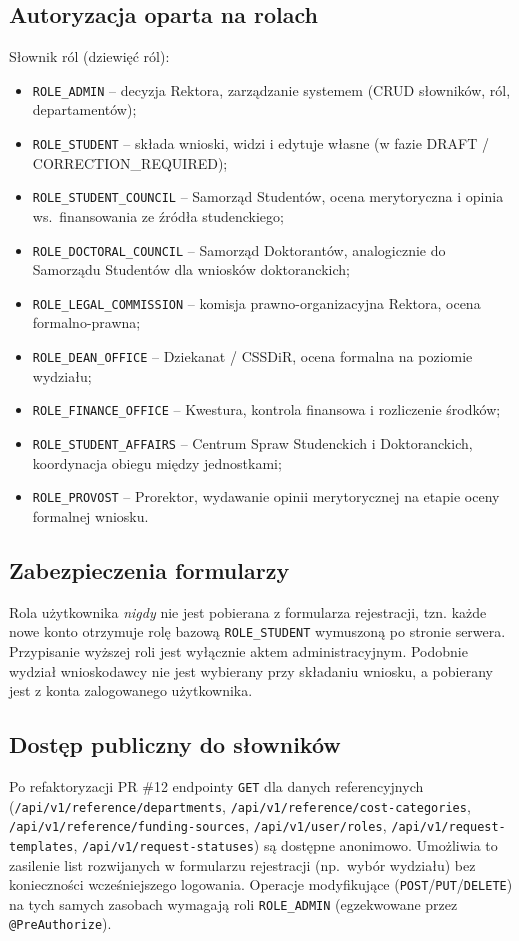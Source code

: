 \documentclass[12pt,a4paper]{article}
\begin{document}
\subsection{Autoryzacja oparta na rolach}
Słownik ról (dziewięć ról):
\begin{itemize}[leftmargin=*]
  \item \texttt{ROLE\_ADMIN} -- decyzja Rektora, zarządzanie systemem (CRUD słowników, ról, departamentów);
  \item \texttt{ROLE\_STUDENT} -- składa wnioski, widzi i edytuje własne (w fazie DRAFT / CORRECTION\_REQUIRED);
  \item \texttt{ROLE\_STUDENT\_COUNCIL} -- Samorząd Studentów, ocena merytoryczna i opinia ws.\ finansowania ze źródła studenckiego;
  \item \texttt{ROLE\_DOCTORAL\_COUNCIL} -- Samorząd Doktorantów, analogicznie do Samorządu Studentów dla wniosków doktoranckich;
  \item \texttt{ROLE\_LEGAL\_COMMISSION} -- komisja prawno-organizacyjna Rektora, ocena formalno-prawna;
  \item \texttt{ROLE\_DEAN\_OFFICE} -- Dziekanat / CSSDiR, ocena formalna na poziomie wydziału;
  \item \texttt{ROLE\_FINANCE\_OFFICE} -- Kwestura, kontrola finansowa i rozliczenie środków;
  \item \texttt{ROLE\_STUDENT\_AFFAIRS} -- Centrum Spraw Studenckich i Doktoranckich, koordynacja obiegu między jednostkami;
  \item \texttt{ROLE\_PROVOST} -- Prorektor, wydawanie opinii merytorycznej na etapie oceny formalnej wniosku.
\end{itemize}

\subsection{Zabezpieczenia formularzy}
Rola użytkownika \emph{nigdy} nie jest pobierana z formularza rejestracji, tzn.
każde nowe konto otrzymuje rolę bazową \texttt{ROLE\_STUDENT} wymuszoną po stronie
serwera. Przypisanie wyższej roli jest wyłącznie aktem administracyjnym.
Podobnie wydział wnioskodawcy nie jest wybierany przy składaniu wniosku, a
pobierany jest z konta zalogowanego użytkownika.

\subsection{Dostęp publiczny do słowników}
Po refaktoryzacji PR \#12 endpointy \texttt{GET} dla danych referencyjnych
(\texttt{/api/v1/reference/departments}, \texttt{/api/v1/reference/cost-categories},
\texttt{/api/v1/reference/funding-sources}, \texttt{/api/v1/user/roles},
\texttt{/api/v1/request-templates}, \texttt{/api/v1/request-statuses})
są dostępne anonimowo. Umożliwia to zasilenie list rozwijanych w formularzu
rejestracji (np.\ wybór wydziału) bez konieczności wcześniejszego logowania.
Operacje modyfikujące (\texttt{POST}/\texttt{PUT}/\texttt{DELETE}) na tych samych
zasobach wymagają roli \texttt{ROLE\_ADMIN} (egzekwowane przez \texttt{@PreAuthorize}).
\end{document}
